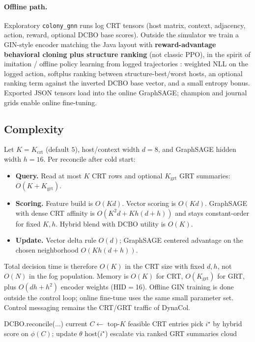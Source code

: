\documentclass[pdflatex,sn-mathphys-num,iicol]{sn-jnl}
\begin{document}
\paragraph{Offline path.}
Exploratory \texttt{colony\_gnn} runs log CRT tensors (host matrix, context,
adjacency, action, reward, optional DCBO base scores). Outside the simulator we
train a GIN-style encoder \cite{xu_gin_iclr2019} matching the Java layout with
\textbf{reward-advantage behavioral cloning plus structure ranking} (not classic
PPO), in the spirit of imitation / offline policy learning from logged
trajectories \cite{ross_aistats2011_dagger,levine_offline_rl2020}: weighted NLL on the logged action, softplus ranking between
structure-best/worst hosts, an optional ranking term against the inverted DCBO
base vector, and a small entropy bonus. Exported JSON tensors load into the
online GraphSAGE; champion and journal grids enable online fine-tuning.

\subsection{Complexity}
\label{sec:complexity}
Let $K{=}K_{\mathrm{crt}}$ (default $5$), host/context width $d{=}8$, and GraphSAGE
hidden width $h{=}16$. Per reconcile after cold start:
\begin{itemize}
\item \textbf{Query.} Read at most $K$ CRT rows and optional $K_{\mathrm{grt}}$ GRT
summaries: $O(K+K_{\mathrm{grt}})$.
\item \textbf{Scoring.} Feature build is $O(Kd)$. Vector scoring is $O(Kd)$.
GraphSAGE with dense CRT affinity is $O(K^2 d+K h(d+h))$ and stays constant-order
for fixed $K,h$. Hybrid blend with DCBO utility is $O(K)$.
\item \textbf{Update.} Vector delta rule $O(d)$; GraphSAGE centered advantage on
the chosen neighborhood $O(K h(d+h))$.
\end{itemize}
Total decision time is therefore $O(K)$ in the CRT size with fixed $d,h$, not
$O(N)$ in the fog population. Memory is $O(K)$ for CRT, $O(K_{\mathrm{grt}})$ for
GRT, plus $O(dh+h^2)$ encoder weights (HID$=$16). Offline GIN training is done
outside the control loop; online fine-tune uses the same small parameter set.
Control messaging remains the CRT/GRT traffic of DynaCol.

\begin{algorithm}[t]
\caption{Colony-bounded hybrid reconcile (sketch)}
\label{alg:reconcile}
\begin{algorithmic}[1]
    \State \Return DCBO.reconcile($\ldots$)
  \EndIf
    \State \Return current
  \EndIf
    \State $C\leftarrow$ top-$K$ feasible CRT entries
    \State pick $i^\star$ by hybrid score on $\phi(C)$; update $\theta$
    \State \Return host($i^\star$)
  \EndIf
    \State escalate via ranked GRT summaries
  \EndIf
  \State \Return cloud 
\EndProcedure
\end{algorithmic}
\end{algorithm}
\end{document}
